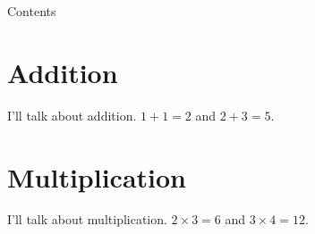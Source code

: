 \documentclass[11pt]{beamer}
\begin{document}
\maketitle

\begin{frame}{Contents}
\tableofcontents
\end{frame}

\section{Addition}

\begin{frame}{\secname}
I'll talk about addition. $1 + 1 = 2$ and $2 + 3 = 5$.
\end{frame}

\section{Multiplication}

\begin{frame}{\secname}
I'll talk about multiplication. $2 \times 3 = 6$ and $3 \times 4 = 12$.
\end{frame}
\end{document}
